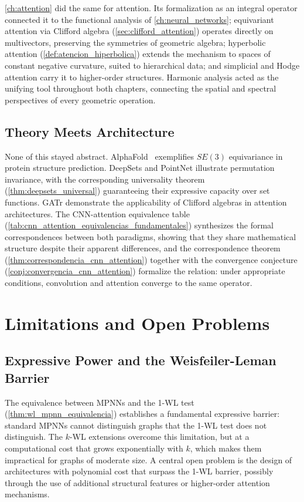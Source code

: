 \autoref{ch:attention} did the same for attention. Its formalization as an integral operator connected it to the functional analysis of \autoref{ch:neural_networks}; equivariant attention via Clifford algebra (\autoref{sec:clifford_attention}) operates directly on multivectors, preserving the symmetries of geometric algebra; hyperbolic attention (\autoref{def:atencion_hiperbolica}) extends the mechanism to spaces of constant negative curvature, suited to hierarchical data; and simplicial and Hodge attention carry it to higher-order structures. Harmonic analysis acted as the unifying tool throughout both chapters, connecting the spatial and spectral perspectives of every geometric operation.

\subsection{Theory Meets Architecture}

None of this stayed abstract. AlphaFold~\citep{jumper2021alphafold} exemplifies $SE(3)$ equivariance in protein structure prediction. DeepSets and PointNet illustrate permutation invariance, with the corresponding universality theorem (\autoref{thm:deepsets_universal}) guaranteeing their expressive capacity over set functions. \gls{GATr} demonstrate the applicability of Clifford algebras in attention architectures. The \gls{CNN}-attention equivalence table (\autoref{tab:cnn_attention_equivalencias_fundamentales}) synthesizes the formal correspondences between both paradigms, showing that they share mathematical structure despite their apparent differences, and the correspondence theorem (\autoref{thm:correspondencia_cnn_attention}) together with the convergence conjecture (\autoref{conj:convergencia_cnn_attention}) formalize the relation: under appropriate conditions, convolution and attention converge to the same operator.


\section{Limitations and Open Problems}

\subsection{Expressive Power and the Weisfeiler-Leman Barrier}

The equivalence between \glspl{MPNN} and the 1-WL test (\autoref{thm:wl_mpnn_equivalencia}) establishes a fundamental expressive barrier: standard \glspl{MPNN} cannot distinguish graphs that the 1-WL test does not distinguish. The $k$-WL extensions overcome this limitation, but at a computational cost that grows exponentially with $k$, which makes them impractical for graphs of moderate size. A central open problem is the design of architectures with polynomial cost that surpass the 1-WL barrier, possibly through the use of additional structural features or higher-order attention mechanisms.

